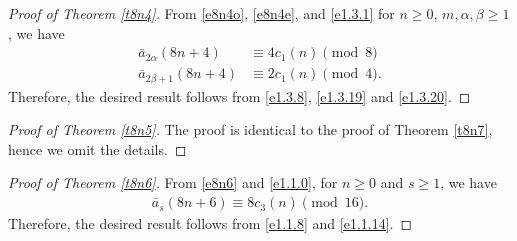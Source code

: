 \documentclass[11pt,a4paper]{article}
\numberwithin{equation}{section}
\theoremstyle{plain}
\begin{document}
\begin{proof}[Proof of Theorem \ref{t8n4}\unskip]
		From \eqref{e8n4o}, \eqref{e8n4e}, and \eqref{e1.3.1} for $n\ge 0$, $m,\alpha,\beta\ge 1$, we have
	\begin{align}
		\bar{a}_{2\alpha}(8n+4)&\equiv 4c_1(n)\pmod{8}\label{e1.3.19}\\
		\bar{a}_{2\beta+1}(8n+4)&\equiv 2c_1(n)\pmod 4.\label{e1.3.20}
	\end{align}
	Therefore, the desired result follows from \eqref{e1.3.8}, \eqref{e1.3.19} and \eqref{e1.3.20}.
\end{proof}
	\begin{proof}[Proof of Theorem \ref{t8n5}\unskip]
		The proof is identical to the proof of Theorem \ref{t8n7}, hence we omit the details. 
\end{proof}
		\begin{proof}[Proof of Theorem \ref{t8n6}\unskip]
		From \eqref{e8n6} and \eqref{e1.1.0}, for $n\ge 0$ and $s\ge 1$, we have
		\begin{align}\label{e1.1.14}
			\bar{a}_{s}(8n+6)\equiv 8c_3(n)\pmod{16}.
		\end{align}
		Therefore, the desired result follows from \eqref{e1.1.8} and \eqref{e1.1.14}.
	\end{proof}
\end{document}
